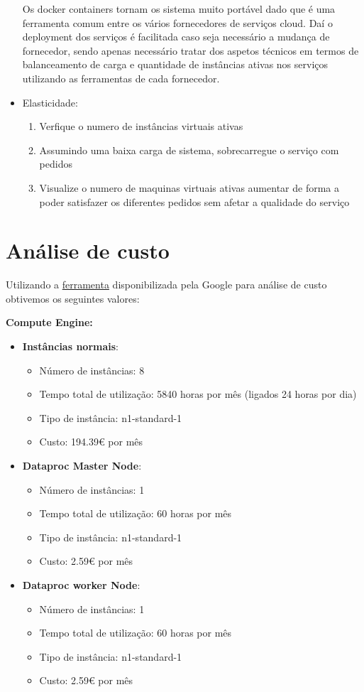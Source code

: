 \documentclass[11pt,a4paper]{article}
\begin{document}
\begin{itemize}
Os docker containers tornam os sistema muito portável dado que é uma ferramenta comum entre os vários fornecedores de serviços cloud. Daí o deployment dos serviços é facilitada caso seja necessário a mudança de fornecedor, sendo apenas necessário tratar dos aspetos técnicos em termos de balanceamento de carga e quantidade de instâncias ativas nos serviços utilizando as ferramentas de cada fornecedor.

	\item Elasticidade:
	\begin{enumerate}
		\item Verfique o numero de instâncias virtuais ativas
		\item Assumindo uma baixa carga de sistema, sobrecarregue o serviço com pedidos
		\item Visualize o numero de maquinas virtuais ativas aumentar de forma a poder satisfazer os diferentes pedidos sem afetar a qualidade do serviço
	\end{enumerate}
\end{itemize}

\section{Análise de custo}
Utilizando a \href{https://cloud.google.com/products/calculator}{ferramenta} disponibilizada pela Google para análise de custo obtivemos os seguintes valores:

\textbf{Compute Engine:}
\begin{itemize}
	\item \textbf{Instâncias normais}:
	\begin{itemize}
		\item Número de instâncias: 8
		\item Tempo total de utilização: 5840 horas por mês (ligados 24 horas por dia)
		\item Tipo de instância: n1-standard-1
		\item Custo: 194.39€ por mês
	\end{itemize}
	\item \textbf{Dataproc Master Node}:
		\begin{itemize}
		\item Número de instâncias: 1
		\item Tempo total de utilização: 60 horas por mês
		\item Tipo de instância: n1-standard-1
		\item Custo: 2.59€ por mês
	\end{itemize}
	\item \textbf{Dataproc worker Node}:
		\begin{itemize}
		\item Número de instâncias: 1
		\item Tempo total de utilização: 60 horas por mês
		\item Tipo de instância: n1-standard-1
		\item Custo: 2.59€ por mês
	\end{itemize}
\end{itemize}
\end{document}
